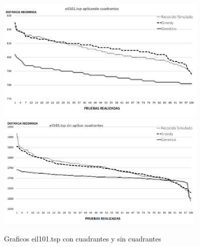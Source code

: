  \begin{figure}[hbtp]
    \centering
        \includegraphics[width=0.9\textwidth]{PruebasResultados/Experimentos_Graficos_Con/eil101.png}
        \includegraphics[width=0.9\textwidth]{PruebasResultados/Experimentos_Graficos_Sin/eil101.png}
        \caption{Graficos eil101.tsp con cuadrantes y sin cuadrantes}
        \label{fig:eil101_grafica.png}
\end{figure}
\newpage

